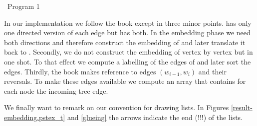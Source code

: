 \begin{table}
~\hrulefill Program 1 \label{program} \hrulefill

\end{table}






In our implementation we follow the book except in three minor points. 
has only one directed
version of each edge but  has both. In the embedding
phase we need both
directions and therefore construct the embedding of
 and later translate it back to . Secondly, we do not
construct the embedding
of  vertex by vertex but in one shot. To that effect we compute a
labelling
 of the edges of  and later sort the edges.
Thirdly, the book makes reference to edges $(w_{i-1},w_i)$
and their reversals. To make these edges available we compute an array 
that contains for each node the incoming tree edge.


We finally want to remark on our convention for drawing lists.
In Figures \ref{result-embedding.pstex_t}
and \ref{glueing} the arrows indicate the end (!!!) of the lists.

\clearpage



